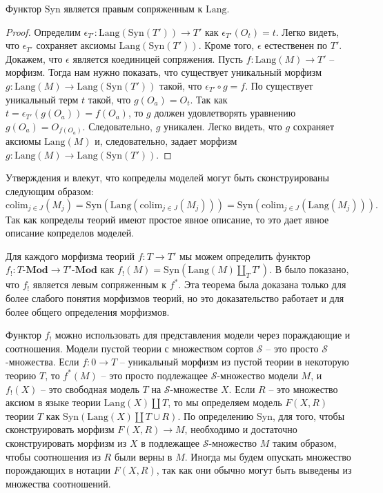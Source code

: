\documentclass[reqno]{amsart}
\theoremstyle{definition}
\theoremstyle{remark}
\newcommand{\bcat}[1]{\mathbf{#1}}
\newcommand{\Mod}[1]{#1\text{-}\bcat{Mod}}
\newcommand{\fs}[1]{\mathrm{#1}}
\newcommand{\Lang}{\fs{Lang}}
\newcommand{\Syn}{\fs{Syn}}
\newcommand{\colim}{\fs{colim}}
\begin{document}
\begin{prop}
Функтор $\Syn$ является правым сопряженным к $\Lang$.
\end{prop}
\begin{proof}
Определим $\epsilon_{T'} : \Lang(\Syn(T')) \to T'$ как $\epsilon_{T'}(O_t) = t$.
Легко видеть, что $\epsilon_{T'}$ сохраняет аксиомы $\Lang(\Syn(T'))$.
Кроме того, $\epsilon$ естественен по $T'$.
Докажем, что $\epsilon$ является коединицей сопряжения.
Пусть $f : \Lang(M) \to T'$ -- морфизм.
Тогда нам нужно показать, что существует уникальный морфизм $g : \Lang(M) \to \Lang(\Syn(T'))$ такой, что $\epsilon_{T'} \circ g = f$.
По  существует уникальный терм $t$ такой, что $g(O_a) = O_t$.
Так как $t = \epsilon_{T'}(g(O_a)) = f(O_a)$, то $g$ должен удовлетворять уравнению $g(O_a) = O_{f(O_a)}$.
Следовательно, $g$ уникален.
Легко видеть, что $g$ сохраняет аксиомы $\Lang(M)$ и, следовательно, задает морфизм $g : \Lang(M) \to \Lang(\Syn(T'))$.
\end{proof}

\begin{remark}
Утверждения  и  влекут, что копределы моделей могут быть сконструированы следующим образом:
\[ \colim_{j \in J}(M_j) = \Syn(\Lang(\colim_{j \in J}(M_j))) = \Syn(\colim_{j \in J}(\Lang(M_j))). \]
Так как копределы теорий имеют простое явное описание, то это дает явное описание копределов моделей.
\end{remark}

Для каждого морфизма теорий $f : T \to T'$ мы можем определить функтор $f_! : \Mod{T} \to \Mod{T'}$ как $f_!(M) = \Syn(\Lang(M) \amalg_{T} T')$.
В \cite[Theorem~29]{PHL} было показано, что $f_!$ является левым сопряженным к $f^*$.
Эта теорема была доказана только для более слабого понятия морфизмов теорий, но это доказательство работает и для более общего определения морфизмов.

Функтор $f_!$ можно использовать для представления модели через пораждающие и соотношения.
Модели пустой теории с множеством сортов $\mathcal{S}$ -- это просто $\mathcal{S}$-множества.
Если $f : 0 \to T$ -- уникальный морфизм из пустой теории в некоторую теорию $T$, то $f^*(M)$ -- это просто подлежащее $\mathcal{S}$-множество модели $M$, и $f_!(X)$ -- это свободная модель $T$ на $\mathcal{S}$-множестве $X$.
Если $R$ -- это множество аксиом в языке теории $\Lang(X) \amalg T$, то мы определяем модель $F(X,R)$ теории $T$ как $\Syn(\Lang(X) \amalg T \cup R)$.
По определению $\Syn$, для того, чтобы сконструировать морфизм $F(X,R) \to M$, необходимо и достаточно сконструировать морфизм из $X$ в подлежащее $\mathcal{S}$-множество $M$ таким образом, чтобы соотношения из $R$ были верны в $M$.
Иногда мы будем опускать множество порождающих в нотации $F(X,R)$, так как они обычно могут быть выведены из множества соотношений.
\end{document}
